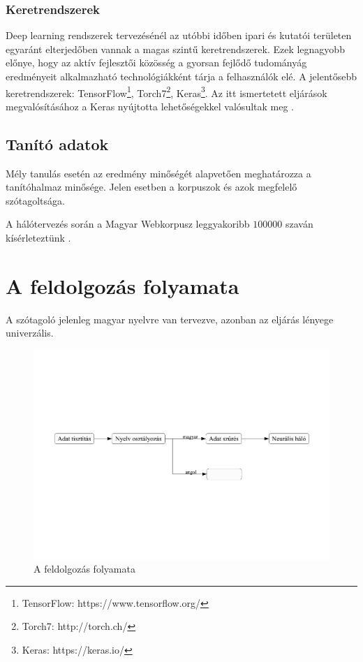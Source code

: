 \documentclass[a4paper, magyar]{article}
\begin{document}
\subsubsection{Keretrendszerek}
Deep learning rendszerek tervezésénél az utóbbi időben ipari és kutatói területen egyaránt elterjedőben vannak a magas szintű keretrendszerek. Ezek legnagyobb előnye, hogy az aktív fejlesztői közösség a gyorsan fejlődő tudományág eredményeit alkalmazható technológiákként tárja a felhasználók elé. A jelentősebb keretrendszerek: TensorFlow\footnote{TensorFlow: https://www.tensorflow.org/}, Torch7\footnote{Torch7: http://torch.ch/}, Keras\footnote{Keras: https://keras.io/}. Az itt ismertetett eljárások megvalósításához a Keras nyújtotta lehetőségekkel valósultak meg \cite{chollet2015keras}.
\subsection{Tanító adatok}
Mély tanulás esetén az eredmény minőségét alapvetően meghatározza a tanítóhalmaz minősége. Jelen esetben a korpuszok és azok megfelelő szótagoltsága.

A hálótervezés során a Magyar Webkorpusz leggyakoribb $100000$ szaván kísérleteztünk \cite{halacsy2004creating,kornai2006web}.

\section{A feldolgozás folyamata}
A szótagoló jelenleg magyar nyelvre van tervezve, azonban az eljárás lényege univerzális.
\begin{figure}[htp]
	\includegraphics[trim={0 7cm 0 7cm},clip,
	width=\textwidth]{figures/preprocessing.pdf}
	\caption{A feldolgozás folyamata}\par\medskip\centering
	\label{fig:gui}
\end{figure}
\end{document}
